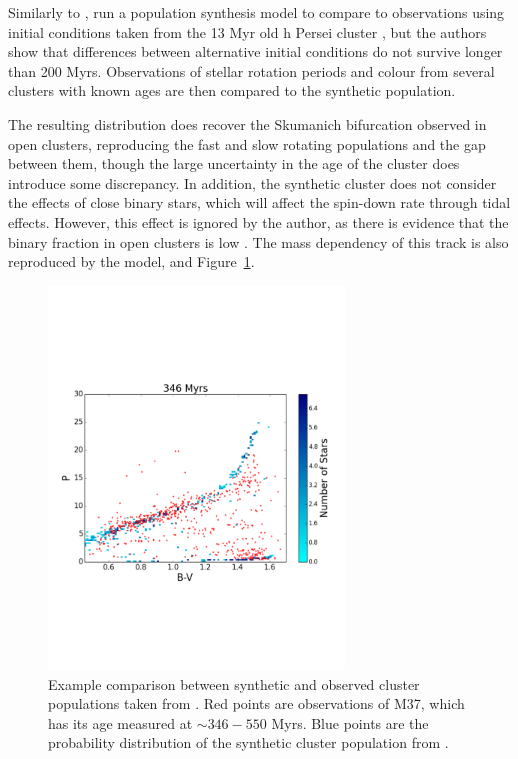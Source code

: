 Similarly to \citet{matt2015}, \citet{garraffo2018a} run a population synthesis model to compare to observations using initial conditions taken from the 13 Myr old h Persei cluster \citep{moraux2013}, but the authors show that differences between alternative initial conditions do not survive longer than 200 Myrs. Observations of stellar rotation periods and colour from several clusters with known ages are then compared to the synthetic population.

The resulting distribution does recover the Skumanich bifurcation observed in open clusters, reproducing the fast and slow rotating populations and the gap between them, though the large uncertainty in the age of the cluster does introduce some discrepancy. 
In addition, the synthetic cluster does not consider the effects of close binary stars, which will affect the spin-down rate through tidal effects. However, this effect is ignored by the author, as there is evidence that the binary fraction in open clusters is low \citep{meibom2007}.
The mass dependency of this track is also reproduced by the model, and Figure~\ref{fig:introduction:garraffo 2018a fig 4}.
\begin{figure}
    \centering
    \includegraphics[width=0.7\textwidth, trim={0 5cm 0 5cm}]{figures/introduction/garraffo2018_M37_346_hPer.pdf}
    \caption{Example comparison between synthetic and observed cluster populations taken from \citet{garraffo2018a}. Red points are observations of M37, which has its age measured at $\sim 346 - 550$ Myrs. Blue points are the probability distribution of the synthetic cluster population from \citet{garraffo2018a}.}
    \label{fig:introduction:garraffo 2018a fig 4}
\end{figure}

